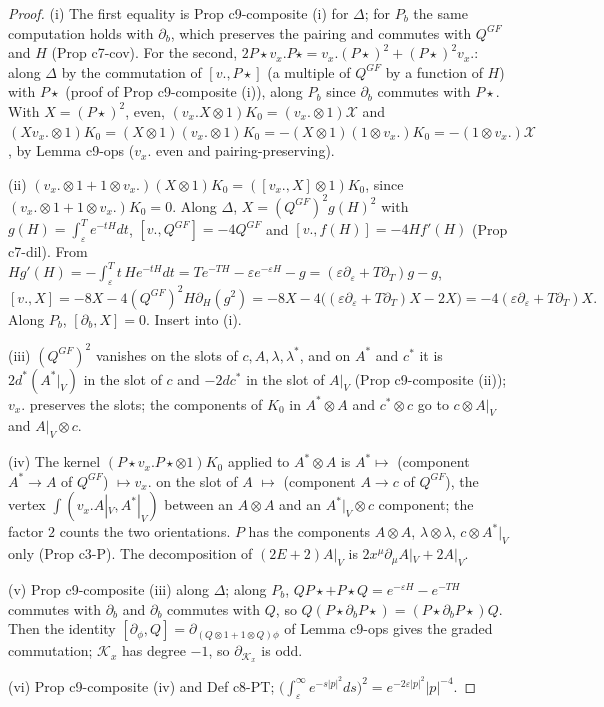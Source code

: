 \documentclass[11pt]{article}
\numberwithin{equation}{section}
\theoremstyle{plain}
\theoremstyle{definition}
\newcommand{\AV}{A|_V}
\begin{document}
\begin{proof}
(i) The first equality is Prop c9-composite (i) for $\Delta$; for $P_b$ the same computation holds with $\partial_b$, which preserves the pairing and commutes with $Q^{GF}$ and $H$ (Prop c7-cov). For the second, $2P\star v_x.P\star=v_x.(P\star)^2+(P\star)^2v_x.$: along $\Delta$ by the commutation of $[v.,P\star]$ (a multiple of $Q^{GF}$ by a function of $H$) with $P\star$ (proof of Prop c9-composite (i)), along $P_b$ since $\partial_b$ commutes with $P\star$. With $X=(P\star)^2$, even, $(v_x.X\otimes1)K_0=(v_x.\otimes1)\mathcal X$ and $(Xv_x.\otimes1)K_0=(X\otimes1)(v_x.\otimes1)K_0=-(X\otimes1)(1\otimes v_x.)K_0=-(1\otimes v_x.)\mathcal X$, by Lemma c9-ops ($v_x.$ even and pairing-preserving).

(ii) $(v_x.\otimes1+1\otimes v_x.)(X\otimes1)K_0=([v_x.,X]\otimes1)K_0$, since $(v_x.\otimes1+1\otimes v_x.)K_0=0$. Along $\Delta$, $X=(Q^{GF})^2g(H)^2$ with $g(H)=\int_\varepsilon^Te^{-tH}dt$, $[v.,Q^{GF}]=-4Q^{GF}$ and $[v.,f(H)]=-4Hf'(H)$ (Prop c7-dil). From $Hg'(H)=-\int_\varepsilon^Tt\,He^{-tH}dt=Te^{-TH}-\varepsilon e^{-\varepsilon H}-g=(\varepsilon\partial_\varepsilon+T\partial_T)g-g$,
\[
[v.,X]=-8X-4(Q^{GF})^2H\partial_H(g^2)=-8X-4\big((\varepsilon\partial_\varepsilon+T\partial_T)X-2X\big)=-4(\varepsilon\partial_\varepsilon+T\partial_T)X.
\]
Along $P_b$, $[\partial_b,X]=0$. Insert into (i).

(iii) $(Q^{GF})^2$ vanishes on the slots of $c,A,\lambda,\lambda^*$, and on $A^*$ and $c^*$ it is $2d^*(A^*|_V)$ in the slot of $c$ and $-2dc^*$ in the slot of $\AV$ (Prop c9-composite (ii)); $v_x.$ preserves the slots; the components of $K_0$ in $A^*\otimes A$ and $c^*\otimes c$ go to $c\otimes\AV$ and $\AV\otimes c$.

(iv) The kernel $(P\star v_x.P\star\otimes1)K_0$ applied to $A^*\otimes A$ is $A^*\mapsto$ (component $A^*\to A$ of $Q^{GF}$) $\mapsto v_x.$ on the slot of $A$ $\mapsto$ (component $A\to c$ of $Q^{GF}$), the vertex $\int(v_x.\AV,A^*|_V)$ between an $A\otimes A$ and an $A^*|_V\otimes c$ component; the factor $2$ counts the two orientations. $P$ has the components $A\otimes A$, $\lambda\otimes\lambda$, $c\otimes A^*|_V$ only (Prop c3-P). The decomposition of $(2E+2)\AV$ is $2x^\mu\partial_\mu\AV+2\AV$.

(v) Prop c9-composite (iii) along $\Delta$; along $P_b$, $QP\star+P\star Q=e^{-\varepsilon H}-e^{-TH}$ commutes with $\partial_b$ and $\partial_b$ commutes with $Q$, so $Q(P\star\partial_bP\star)=(P\star\partial_bP\star)Q$. Then the identity $[\partial_\phi,Q]=\partial_{(Q\otimes1+1\otimes Q)\phi}$ of Lemma c9-ops gives the graded commutation; $\mathcal K_x$ has degree $-1$, so $\partial_{\mathcal K_x}$ is odd.

(vi) Prop c9-composite (iv) and Def c8-PT; $\big(\int_\varepsilon^\infty e^{-s|p|^2}ds\big)^2=e^{-2\varepsilon|p|^2}|p|^{-4}$.
\end{proof}
\end{document}
